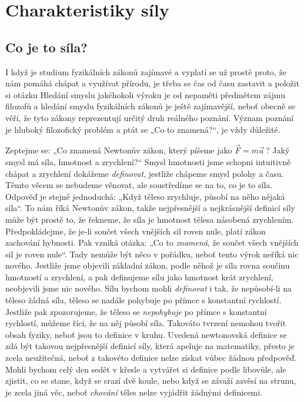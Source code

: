 \chapter{Charakteristiky síly}\label{fyz:IchapXII}
\minitoc
  \section{Co je to síla?}\label{fyz:IchapXIIsecI}
    I když je studium fyzikálních zákonů zajímavé a vyplatí se už prostě proto, že nám pomáhá 
    chápat a využívat přírodu, je třeba se čas od času zastavit a položit si otázku  Hledání smyslu jakéhokoli výroku je od nepaměti předmětem zájmu 
    filozofů a hledání smyslu fyzikálních zákonů je ještě zajímavější, neboť obecně se věří, že 
    tyto zákony reprezentují určitý druh reálného poznání. Význam poznání je hluboký filozofický 
    problém a ptát se „Co to znamená?“, je vždy důležité.
    
    Zeptejme se: „Co znamená Newtonův zákon, který píšeme jako \(\vec{F}=m \vec{a}\,\)? Jaký smysl 
    má síla, hmotnost a zrychlení?“ Smysl hmotnosti jsme schopni intuitivně chápat a zrychlení 
    dokážeme \emph{definovat}, jestliže chápeme smysl polohy a času. Těmto věcem se nebudeme 
    věnovat, ale soustředíme se na to, co je to síla. Odpověď je stejně jednoduchá: „Když těleso 
    zrychluje, působí na něho nějaká síla“. To nám říká Newtonův zákon, takže nejpřesnější a 
    nejkrásnější definicí síly může být prostě to, že řekneme, že síla je hmotnost tělesa násobená 
    zrychlením. Předpokládejme, že je-li součet všech vnějších sil roven nule, platí zákon 
    zachování hybnosti. Pak vzniká otázka: „Co to \emph{znamená}, že součet všech vnějších sil je 
    roven nule“. Tady nemůže být něco v pořádku, neboť tento výrok neříká nic nového. Jestliže jsme 
    objevili základní zákon, podle něhož je síla rovna součinu hmotností a zrychlení, a pak 
    definujeme sílu jako hmotnost krát zrychlení, neobjevili jsme nic nového. Sílu bychom mohli 
    \emph{definovat} i tak, že nepůsobí-li na těleso žádná síla, těleso se nadále pohybuje po 
    přímce s konstantní rychlostí. Jestliže pak zpozorujeme, že těleso se \emph{nepohybuje} po 
    přímce s konstantní rychlostí, můžeme říci, že na něj působí síla. Takováto tvrzení nemohou 
    tvořit obsah fyziky, neboť jsou to definice v kruhu. Uvedená newtonovská definice se zdá být 
    takovou nejpřesnější definicí síly, která apeluje na matematiky, přesto je zcela neužitečná, 
    neboť z takovéto definice nelze získat vůbec žádnou předpověď. Mohli bychom celý den sedět v 
    křesle a vytvářet si definice podle libovůle, ale zjistit, co se stane, když se srazí dvě 
    koule, nebo když se závaží zavěsí na strunu, je zcela jiná věc, neboť \emph{chování} těles 
    nelze vyjádřit žádnými definicemi.
    
